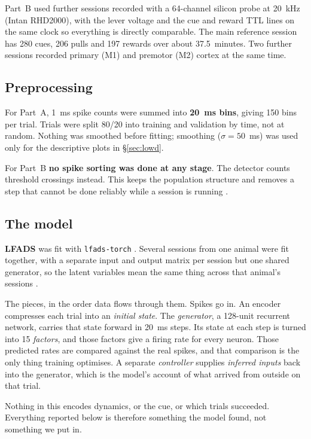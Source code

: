 \documentclass[11pt]{article}
\begin{document}
Part~B used further sessions recorded with a 64-channel silicon probe at 20~kHz
(Intan RHD2000), with the lever voltage and the cue and reward TTL lines on the
same clock so everything is directly comparable. The main reference session has
280 cues, 206 pulls and 197 rewards over about 37.5~minutes. Two further sessions
recorded primary (M1) and premotor (M2) cortex at the same time.

\subsection{Preprocessing}

For Part~A, 1~ms spike counts were summed into \textbf{20~ms bins}, giving 150
bins per trial. Trials were split 80/20 into training and validation by time, not
at random. Nothing was smoothed before fitting; smoothing ($\sigma = 50$~ms) was
used only for the descriptive plots in \S\ref{sec:lowd}.

For Part~B \textbf{no spike sorting was done at any stage}. The detector counts
threshold crossings instead. This keeps the population structure and removes a
step that cannot be done reliably while a session is running
\cite{trautmann2019}.

\subsection{The model}

\textbf{LFADS} \cite{pandarinath2018} was fit with \texttt{lfads-torch}
\cite{sedler2023}. Several sessions from one animal were fit together, with a
separate input and output matrix per session but one shared generator, so the
latent variables mean the same thing across that animal's sessions
\cite{keshtkaran2022}.

The pieces, in the order data flows through them. Spikes go in. An encoder
compresses each trial into an \emph{initial state}. The \emph{generator}, a
128-unit recurrent network, carries that state forward in 20~ms steps. Its state
at each step is turned into 15 \emph{factors}, and those factors give a firing
rate for every neuron. Those predicted rates are compared against the real
spikes, and that comparison is the only thing training optimises. A separate
\emph{controller} supplies \emph{inferred inputs} back into the generator, which
is the model's account of what arrived from outside on that trial.

Nothing in this encodes dynamics, or the cue, or which trials succeeded.
Everything reported below is therefore something the model found, not something
we put in.
\end{document}

